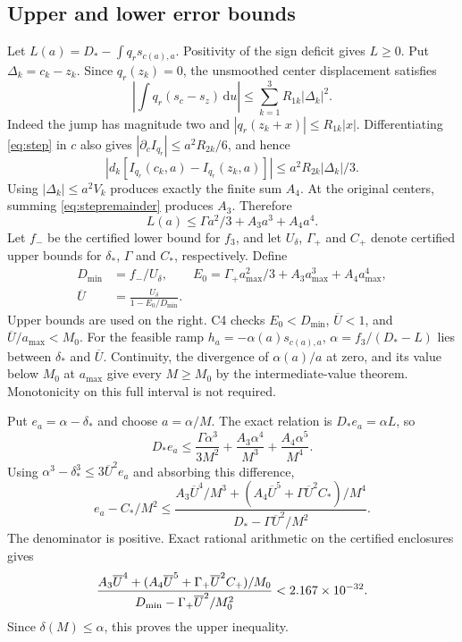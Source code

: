 \documentclass[11pt,a4paper]{article}
\numberwithin{equation}{section}
\theoremstyle{remark}\newtheorem{remark}[theorem]{Remark}
\newcommand{\dd}{\,\mathrm du}
\newcommand{\ds}{\delta_*}
\newcommand{\Ds}{D_*}
\newcommand{\Cs}{C_*}
\begin{document}
\subsection{Upper and lower error bounds}
Let $L(a)=\Ds-\int q_rs_{c(a),a}$. Positivity of the sign deficit gives
$L\ge0$. Put $\Delta_k=c_k-z_k$. Since $q_r(z_k)=0$, the
unsmoothed center displacement satisfies
\begin{equation}
 \left|\int q_r(s_c-s_z)\dd\right|
 \le\sum_{k=1}^3 R_{1k}|\Delta_k|^2.
 \label{eq:shiftloss}
\end{equation}
Indeed the jump has magnitude two and
$|q_r(z_k+x)|\le R_{1k}|x|$. Differentiating \eqref{eq:step} in $c$
also gives $|\partial_c I_{q_r}|\le a^2R_{2k}/6$, and hence
\begin{equation}
 |d_k[I_{q_r}(c_k,a)-I_{q_r}(z_k,a)]|
 \le a^2R_{2k}|\Delta_k|/3.
 \label{eq:smoothshift}
\end{equation}
Using $|\Delta_k|\le a^2V_k$ produces exactly the finite sum $A_4$.
At the original centers, summing \eqref{eq:stepremainder} produces
$A_3$. Therefore
\begin{equation}
 L(a)\le\Gamma a^2/3+A_3a^3+A_4a^4.\label{eq:loss}
\end{equation}
Let $f_-$ be the certified lower bound for $f_3$, and let
$U_\delta$, $\Gamma_+$ and $C_+$ denote certified upper bounds for
$\ds$, $\Gamma$ and $\Cs$, respectively. Define
\begin{align}
 D_{\min}&=f_-/U_\delta,\qquad
 E_0=\Gamma_+a_{\max}^2/3+A_3a_{\max}^3+A_4a_{\max}^4,\\
 \overline U&=\frac{U_\delta}{1-E_0/D_{\min}}.\label{eq:Ubar}
\end{align}
Upper bounds are used on the right. C4 checks
$E_0<D_{\min}$, $\overline U<1$, and $\overline U/a_{\max}<M_0$.
For the feasible ramp $h_a=-\alpha(a)s_{c(a),a}$,
$\alpha=f_3/(\Ds-L)$ lies between $\ds$ and $\overline U$.
Continuity, the divergence of $\alpha(a)/a$ at zero, and its value below
$M_0$ at $a_{\max}$ give every $M\ge M_0$ by the intermediate-value
theorem. Monotonicity on this full interval is not required.

Put $e_a=\alpha-\ds$ and choose $a=\alpha/M$. The exact relation is
$\Ds e_a=\alpha L$, so
\begin{equation}
 \Ds e_a\le\frac{\Gamma\alpha^3}{3M^2}
 +\frac{A_3\alpha^4}{M^3}+\frac{A_4\alpha^5}{M^4}.
\end{equation}
Using $\alpha^3-\ds^3\le3\overline U^2e_a$ and absorbing this difference,
\begin{equation}
 e_a-\Cs/M^2\le
 \frac{A_3\overline U^4/M^3+
       (A_4\overline U^5+\Gamma\overline U^2\Cs)/M^4}
      {\Ds-\Gamma\overline U^2/M^2}.\label{eq:absorb}
\end{equation}
The denominator is positive. Exact rational arithmetic on the certified
enclosures gives
\begin{equation}
 \frac{A_3\overline U^4+
 (A_4\overline U^5+\Gamma_+\overline U^2C_+)/M_0}
 {D_{\min}-\Gamma_+\overline U^2/M_0^2}<2.167\times10^{-32}.\label{eq:Kplus}
\end{equation}
Since $\delta(M)\le\alpha$, this proves the upper inequality.
\end{document}
